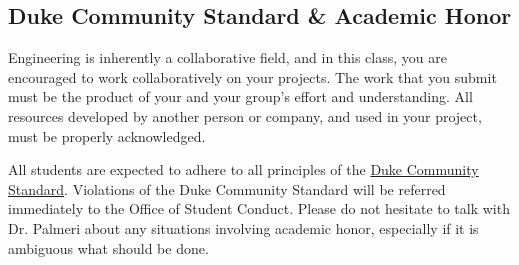 \subsection*{Duke Community Standard \& Academic Honor}
Engineering is inherently a collaborative field, and in this class, you are
encouraged to work collaboratively on your projects. The
 work that you submit
must be the product of your and your group’s effort and understanding. All
resources developed by another person or company, and used in your project,
must be properly acknowledged.

All students are expected to adhere to all principles of the
\href{https://trinity.duke.edu/undergraduate/academic-policies/community-standard-student-conduct}{Duke
Community Standard}. Violations of the Duke Community
 Standard will be referred
immediately to the Office of Student Conduct. Please do not hesitate to talk
with Dr. Palmeri about any
 situations involving academic honor, especially if
it is ambiguous what should be done.